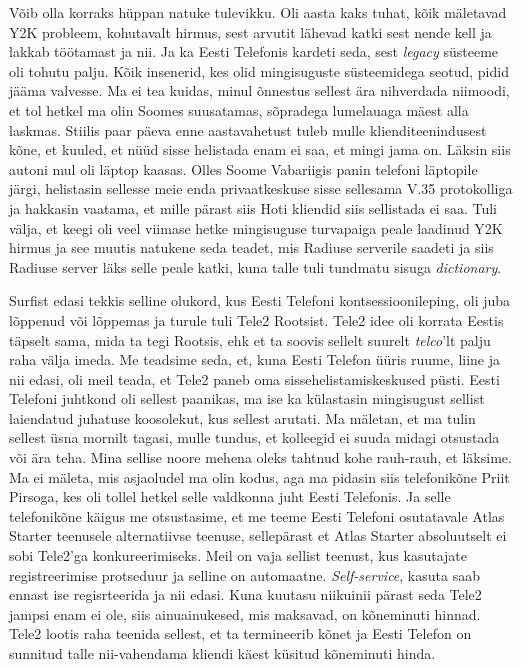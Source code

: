 Võib olla korraks hüppan natuke tulevikku. Oli aasta kaks tuhat, kõik mäletavad Y2K probleem, kohutavalt hirmus, sest arvutit lähevad katki sest nende kell ja lakkab töötamast ja nii. Ja ka Eesti Telefonis kardeti seda, sest \emph{legacy} süsteeme oli tohutu palju. Kõik insenerid, kes olid mingisuguste süsteemidega seotud, pidid jääma  valvesse. Ma ei tea kuidas, minul õnnestus sellest ära nihverdada niimoodi, et tol hetkel ma olin Soomes suusatamas, sõpradega lumelauaga mäest alla laskmas. Stiilis paar päeva enne aastavahetust tuleb mulle  klienditeenindusest kõne, et kuuled, et nüüd sisse helistada enam ei saa, et mingi jama on. Läksin siis autoni mul oli läptop kaasas. Olles Soome Vabariigis panin telefoni läptopile järgi, helistasin sellesse meie enda privaatkeskuse sisse sellesama V.35  protokolliga ja hakkasin  vaatama, et mille pärast siis Hoti kliendid siis sellistada ei saa. Tuli välja, et keegi oli veel viimase hetke mingisuguse turvapaiga peale laadinud Y2K hirmus ja see muutis natukene seda teadet, mis Radiuse serverile saadeti ja siis Radiuse server läks selle peale katki, kuna talle tuli tundmatu sisuga \emph{dictionary}.

Surfist edasi tekkis selline olukord, kus Eesti Telefoni kontsessioonileping, oli juba lõppenud või lõppemas ja turule tuli Tele2 Rootsist. Tele2  idee oli korrata Eestis täpselt sama, mida ta tegi Rootsis, ehk et ta soovis sellelt suurelt \emph{telco}'lt palju raha välja imeda. Me teadsime seda, et, kuna Eesti Telefon üüris ruume, liine ja nii edasi, oli meil teada, et Tele2 paneb oma sissehelistamiskeskused püsti. Eesti Telefoni juhtkond oli sellest paanikas, ma ise ka külastasin mingisugust sellist laiendatud juhatuse koosolekut, kus sellest arutati. Ma mäletan, et ma tulin sellest üsna mornilt tagasi, mulle tundus, et kolleegid ei suuda  midagi otsustada või ära teha. Mina sellise noore mehena oleks tahtnud kohe rauh-rauh, et läksime. Ma ei mäleta, mis asjaoludel ma olin kodus, aga ma pidasin siis telefonikõne Priit Pirsoga, kes oli tollel hetkel selle valdkonna juht Eesti Telefonis. Ja selle telefonikõne käigus me otsustasime, et me teeme Eesti Telefoni osutatavale Atlas Starter teenusele alternatiivse teenuse, sellepärast et Atlas Starter absoluutselt ei sobi Tele2'ga konkureerimiseks. Meil on vaja sellist teenust, kus kasutajate  registreerimise protseduur ja selline on automaatne. \emph{Self-service}, kasuta saab ennast ise regisrteerida ja nii edasi. Kuna  kuutasu niikuinii pärast seda Tele2 jampsi enam ei ole, siis ainuainukesed, mis maksavad, on kõneminuti hinnad. Tele2  lootis  raha teenida sellest, et ta termineerib kõnet ja Eesti Telefon on sunnitud talle nii-vahendama  kliendi käest küsitud kõneminuti hinda. 

